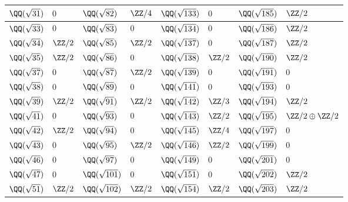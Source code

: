 \begin{center}
\begin{tabular}{x{1.5cm}x{1.5cm}x{1.5cm}x{1.5cm}x{1.5cm}x{1.5cm}x{1.5cm}x{1.5cm}}
$\QQ (\sqrt{31})$ & $0$ & $\QQ (\sqrt{82})$ & $\ZZ/4$ & $\QQ (\sqrt{133})$ & $0$ & $\QQ (\sqrt{185})$ & $\ZZ/2$ \tabularnewline\hline
$\QQ (\sqrt{33})$ & $0$ & $\QQ (\sqrt{83})$ & $0$ & $\QQ (\sqrt{134})$ & $0$ & $\QQ (\sqrt{186})$ & $\ZZ/2$ \tabularnewline\hline
$\QQ (\sqrt{34})$ & $\ZZ/2$ & $\QQ (\sqrt{85})$ & $\ZZ/2$ & $\QQ (\sqrt{137})$ & $0$ & $\QQ (\sqrt{187})$ & $\ZZ/2$ \tabularnewline\hline
$\QQ (\sqrt{35})$ & $\ZZ/2$ & $\QQ (\sqrt{86})$ & $0$ & $\QQ (\sqrt{138})$ & $\ZZ/2$ & $\QQ (\sqrt{190})$ & $\ZZ/2$ \tabularnewline\hline
$\QQ (\sqrt{37})$ & $0$ & $\QQ (\sqrt{87})$ & $\ZZ/2$ & $\QQ (\sqrt{139})$ & $0$ & $\QQ (\sqrt{191})$ & $0$ \tabularnewline\hline
$\QQ (\sqrt{38})$ & $0$ & $\QQ (\sqrt{89})$ & $0$ & $\QQ (\sqrt{141})$ & $0$ & $\QQ (\sqrt{193})$ & $0$ \tabularnewline\hline
$\QQ (\sqrt{39})$ & $\ZZ/2$ & $\QQ (\sqrt{91})$ & $\ZZ/2$ & $\QQ (\sqrt{142})$ & $\ZZ/3$ & $\QQ (\sqrt{194})$ & $\ZZ/2$ \tabularnewline\hline
$\QQ (\sqrt{41})$ & $0$ & $\QQ (\sqrt{93})$ & $0$ & $\QQ (\sqrt{143})$ & $\ZZ/2$ & $\QQ (\sqrt{195})$ & $\ZZ/2\oplus\ZZ/2$ \tabularnewline\hline
$\QQ (\sqrt{42})$ & $\ZZ/2$ & $\QQ (\sqrt{94})$ & $0$ & $\QQ (\sqrt{145})$ & $\ZZ/4$ & $\QQ (\sqrt{197})$ & $0$ \tabularnewline\hline
$\QQ (\sqrt{43})$ & $0$ & $\QQ (\sqrt{95})$ & $\ZZ/2$ & $\QQ (\sqrt{146})$ & $\ZZ/2$ & $\QQ (\sqrt{199})$ & $0$ \tabularnewline\hline
$\QQ (\sqrt{46})$ & $0$ & $\QQ (\sqrt{97})$ & $0$ & $\QQ (\sqrt{149})$ & $0$ & $\QQ (\sqrt{201})$ & $0$ \tabularnewline\hline
$\QQ (\sqrt{47})$ & $0$ & $\QQ (\sqrt{101})$ & $0$ & $\QQ (\sqrt{151})$ & $0$ & $\QQ (\sqrt{202})$ & $\ZZ/2$ \tabularnewline\hline
$\QQ (\sqrt{51})$ & $\ZZ/2$ & $\QQ (\sqrt{102})$ & $\ZZ/2$ & $\QQ (\sqrt{154})$ & $\ZZ/2$ & $\QQ (\sqrt{203})$ & $\ZZ/2$ \tabularnewline\hline
\end{tabular}
\end{center}

\pagebreak

